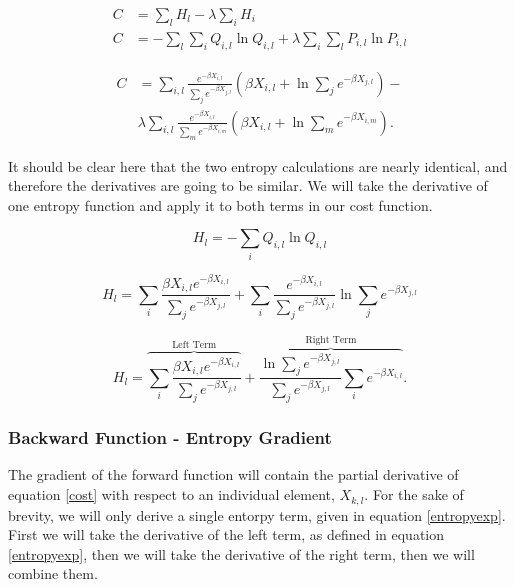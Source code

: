 \documentclass[smallextended]{svjour3}       %
\begin{document}
\begin{displaymath}
\begin{align}

    C& = \sum_{l}H_{l} - \lambda \sum_{i}H_{i}\\

    C& = - \sum_{l}\sum_{i} Q_{i,l} \ln Q_{i,l} + \lambda \sum_{i}\sum_{l} P_{i,l} \ln P_{i,l}
\end{align}
\end{displaymath}

\begin{equation} \label{cost}
\begin{aligned}
    C& = \sum_{i,l}\frac{e^{-\beta X_{i,l}}}{\sum_{j}e^{-\beta X_{j,l}}} \left(\beta X_{i,l} + \ln{\sum_{j}e^{-\beta X_{j,l}}}\right) -\\ 
     & \lambda \sum_{i,l}\frac{e^{-\beta X_{i,l}}}{\sum_{m} e^{-\beta X_{i,m}}} \left(\beta X_{i,l} + \ln{\sum_{m}e^{-\beta X_{i,m}}}\right).
\end{aligned}
\end{equation}

\noindent It should be clear here that the two entropy calculations are nearly identical, and therefore the derivatives are going to be similar. We will take the derivative of one entropy function and apply it to both terms in our cost function.

\begin{displaymath}
    H_{l} = - \sum_{i} Q_{i,l} \ln Q_{i,l}
\end{displaymath}

\begin{displaymath}
    H_{l} =
    \sum_{i}\frac{\beta X_{i,l} e^{-\beta X_{i,l}}}{\sum_{j}e^{-\beta X_{j,l}}} + 
    \sum_{i}\frac{e^{-\beta X_{i,l}}}{\sum_{j}e^{-\beta X_{j,l}}}\ln{\sum_{j}e^{-\beta X_{j,l}}}
\end{displaymath}

\begin{equation} \label{entropyexp}
    H_{l} =
    \overbrace{\sum_{i}\frac{\beta X_{i,l}e^{-\beta X_{i,l}}}{\sum_{j}e^{-\beta X_{j,l}}}}^\text{Left Term} + 
    \overbrace{\frac{\ln{\sum_{j}e^{-\beta X_{j,l}}}}{\sum_{j}e^{-\beta X_{j,l}}}\sum_{i}e^{-\beta X_{i,l}}}^\text{Right Term}.
\end{equation}

\subsubsection{Backward Function - Entropy Gradient} \label{entropy_backward}
\noindent The gradient of the forward function will contain the partial derivative of equation \ref{cost} with respect to an individual element, $X_{k,l}$. For the sake of brevity, we will only derive a single entorpy term, given in equation \ref{entropyexp}. First we will take the derivative of the left term, as defined in equation \ref{entropyexp}, then we will take the derivative of the right term, then we will combine them.
\end{document}
